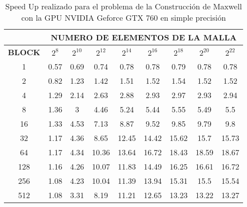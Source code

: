 \begin{table}[h!]
    \begin{tabular}{|c|c|c|c|c|c|c|c|c|}
    \hline
                   & \multicolumn{8}{c|}{\textbf{NUMERO DE ELEMENTOS DE LA MALLA}} \\ \hline
    \textbf{BLOCK} & $2^8$ & $2^10$& $2^12$& $2^14$& $2^16$& $2^18$& $2^20$& $2^22$\\ \hline
    1              & 0.57  & 0.69  & 0.74  & 0.78  & 0.78  & 0.79  & 0.78  & 0.78  \\ \hline
    2              & 0.82  & 1.23  & 1.42  & 1.51  & 1.52  & 1.54  & 1.52  & 1.52  \\ \hline
    4              & 1.29  & 2.14  & 2.63  & 2.88  & 2.93  & 2.97  & 2.93  & 2.94  \\ \hline
    8              & 1.36  & 3     & 4.46  & 5.24  & 5.44  & 5.55  & 5.49  & 5.5   \\ \hline
    16             & 1.33  & 4.53  & 7.13  & 8.87  & 9.52  & 9.85  & 9.79  & 9.8   \\ \hline
    32             & 1.17  & 4.36  & 8.65  & 12.45 & 14.42 & 15.62 & 15.7  & 15.73 \\ \hline
    64             & 1.17  & 4.34  & 10.36 & 13.64 & 16.72 & 18.43 & 18.59 & 18.67 \\ \hline
    128            & 1.16  & 4.26  & 10.07 & 11.83 & 14.49 & 16.25 & 16.61 & 16.72 \\ \hline
    256            & 1.08  & 4.23  & 10.04 & 11.39 & 13.94 & 15.31 & 15.5  & 15.54 \\ \hline
    512            & 1.08  & 3.31  & 8.19  & 11.21 & 12.65 & 13.23 & 13.22 & 13.27 \\ \hline
    \end{tabular}
    \caption{Speed Up realizado para el problema de la Construcción de Maxwell con la GPU NVIDIA Geforce GTX 760 en simple precisión}
    \label{tab:s_760_MxC_simple_10}
    \end{table}
